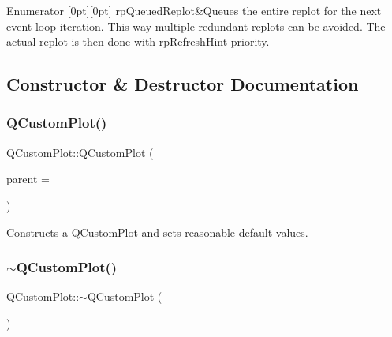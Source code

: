 \begin{DoxyEnumFields}{Enumerator}
[0pt][0pt]{}\mbox{\label{class_q_custom_plot_a45d61392d13042e712a956d27762aa39a019650c6ddf308f97e811fbfff207a8f}} 
rp\+Queued\+Replot&Queues the entire replot for the next event loop iteration. This way multiple redundant replots can be avoided. The actual replot is then done with \mbox{\hyperlink{class_q_custom_plot_a45d61392d13042e712a956d27762aa39a49666a5854a68dbcca8b277b03331260}{rp\+Refresh\+Hint}} priority. \\
\hline

\end{DoxyEnumFields}


\subsection{Constructor \& Destructor Documentation}
\mbox{\label{class_q_custom_plot_a45b99626558651a6428b83972b0b34b8}} 
\subsubsection{\texorpdfstring{QCustomPlot()}{QCustomPlot()}}
{\footnotesize\ttfamily Q\+Custom\+Plot\+::\+Q\+Custom\+Plot (\begin{DoxyParamCaption}\item[{Q\+Widget $\ast$}]{parent = {} }\end{DoxyParamCaption})\hspace{0.3cm}{\ttfamily [explicit]}}

Constructs a \mbox{\hyperlink{class_q_custom_plot}{Q\+Custom\+Plot}} and sets reasonable default values. \mbox{\label{class_q_custom_plot_a75d9b6f599dcae706e45efd425c5499e}} 
\subsubsection{\texorpdfstring{$\sim$QCustomPlot()}{~QCustomPlot()}}
{\footnotesize\ttfamily Q\+Custom\+Plot\+::$\sim$\+Q\+Custom\+Plot (\begin{DoxyParamCaption}{ }\end{DoxyParamCaption})\hspace{0.3cm}{\ttfamily [virtual]}}



